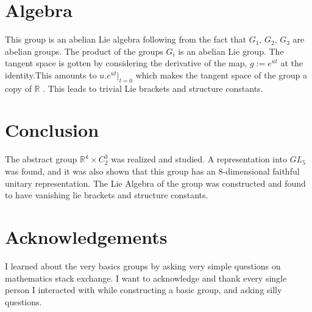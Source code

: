 \documentclass{article}
\begin{document}
\section{Algebra}
    This group is an abelian Lie algebra following from the fact that $G_1$, $G_2$,  $G_3$ are abelian groups. The product of the groups $G_i$ is an abelian Lie group. The tangent space is gotten by considering the derivative of the map, $g:= e^{ut}$ at the identity.This amounts to  $u. e^{u t}|_{t=0}$ which makes the tangent space of the group a copy of $\mathbb{R}$ \cite{4500869}. This  leads to trivial Lie brackets and structure constants.

\section{Conclusion}
 The abstract group  $\mathbb{R^4} \times C_2^3$ was realized and studied. A representation into $GL_5$ was found, and it was also shown that this group has an  8-dimensional faithful unitary representation. The Lie Algebra of the group was constructed and found to have vanishing lie brackets and structure constants.
 
\section*{Acknowledgements}

I learned about the very basics groups by asking very simple questions on mathematics stack exchange. I want to acknowledge and thank every single person I interacted with while constructing a basic group, and asking silly questions.
 
\printbibliography
\end{document}

